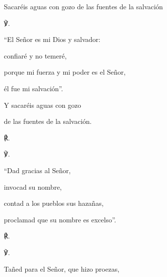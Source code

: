 			\begin{readtheme}Sacaréis aguas con gozo de las fuentes de la salvación\end{readtheme}
			
			\begin{readbody}\begin{readred}℣.\end{readred} “El Señor es mi Dios y salvador:\end{readbody}
			
			\begin{readtabbed}confiaré y no temeré,\end{readtabbed}
			
			\begin{readtabbed}porque mi fuerza y mi poder es el Señor,\end{readtabbed}
			
			\begin{readtabbed}él fue mi salvación”.\end{readtabbed}
			
			\begin{readtabbed}Y sacaréis aguas con gozo\end{readtabbed}
			
			\begin{readtabbed}de las fuentes de la salvación. \begin{readred}℟.\end{readred}\end{readtabbed}
			
			\begin{readbody}\begin{readred}℣.\end{readred} “Dad gracias al Señor,\end{readbody}
			
			\begin{readtabbed}invocad su nombre,\end{readtabbed}
			
			\begin{readtabbed}contad a los pueblos sus hazañas,\end{readtabbed}
			
			\begin{readtabbed}proclamad que su nombre es excelso”. \begin{readred}℟.\end{readred}\end{readtabbed}
			
			\begin{readbody}\begin{readred}℣.\end{readred} Tañed para el Señor, que hizo proezas,\end{readbody}
			
